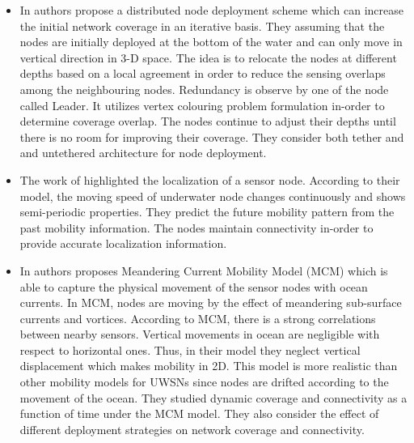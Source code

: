 \documentclass[11pt]{article}
\begin{document}
 \begin{itemize}%
 \item In \cite{akkaya2009self} authors propose a distributed node deployment scheme which can increase the initial network coverage in an iterative basis. They assuming that the nodes are initially deployed at the bottom of the water and can only move in vertical direction in 3-D space. The idea is to relocate the nodes at different depths based on a local agreement in order to reduce the sensing overlaps among the neighbouring nodes. Redundancy is observe by one  of the node called Leader. It utilizes vertex colouring problem formulation in-order to determine coverage overlap. The nodes continue to adjust their depths until there is no room for improving their coverage. They consider both tether and and untethered architecture for node deployment.
 

\item The work of \cite{zhou2011scalable} highlighted the localization of a sensor node. According to their model, the moving speed of underwater node changes continuously and shows semi-periodic properties. They predict the future mobility pattern from the past mobility information. The nodes maintain connectivity in-order to provide accurate localization information.

 \item In \cite{caruso2008meandering} authors proposes Meandering Current Mobility Model (MCM) which is able to capture the physical movement of the sensor nodes with ocean currents. In MCM, nodes are moving by the effect of meandering sub-surface currents and vortices. According to MCM, there is a strong correlations between nearby sensors.
  Vertical movements in ocean are negligible with respect to horizontal ones. Thus, in their model they neglect vertical displacement which makes mobility in 2D. This model is more realistic than other mobility models \cite{jaffe2006sensor}\cite{zhou2011scalable} for UWSNs since nodes are drifted according to the movement of the ocean. They studied dynamic coverage and connectivity as a function of time under the MCM model. They also consider the effect of different deployment strategies on network coverage and connectivity.


\end{itemize}
\end{document}
